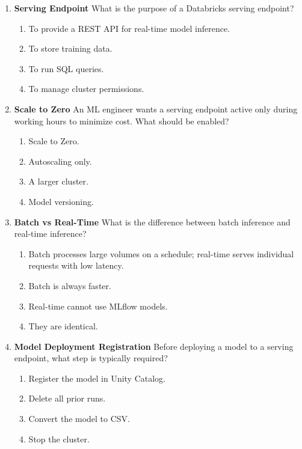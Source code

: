 \documentclass{article}
\begin{document}
\begin{enumerate}[label=\textbf{Q\arabic*.}]
		\subsection*{Domain 4: Model Deployment (12\%)}
		
		\item \textbf{Serving Endpoint}
		What is the purpose of a Databricks serving endpoint?
		\begin{enumerate}[label=\Alph*.]
			\item To provide a REST API for real-time model inference.
			\item To store training data.
			\item To run SQL queries.
			\item To manage cluster permissions.
		\end{enumerate}
		
		\item \textbf{Scale to Zero}
		An ML engineer wants a serving endpoint active only during working hours to minimize cost. What should be enabled?
		\begin{enumerate}[label=\Alph*.]
			\item Scale to Zero.
			\item Autoscaling only.
			\item A larger cluster.
			\item Model versioning.
		\end{enumerate}
		
		\item \textbf{Batch vs Real-Time}
		What is the difference between batch inference and real-time inference?
		\begin{enumerate}[label=\Alph*.]
			\item Batch processes large volumes on a schedule; real-time serves individual requests with low latency.
			\item Batch is always faster.
			\item Real-time cannot use MLflow models.
			\item They are identical.
		\end{enumerate}
		
		\item \textbf{Model Deployment Registration}
		Before deploying a model to a serving endpoint, what step is typically required?
		\begin{enumerate}[label=\Alph*.]
			\item Register the model in Unity Catalog.
			\item Delete all prior runs.
			\item Convert the model to CSV.
			\item Stop the cluster.
		\end{enumerate}
		

\end{enumerate}
\end{document}
